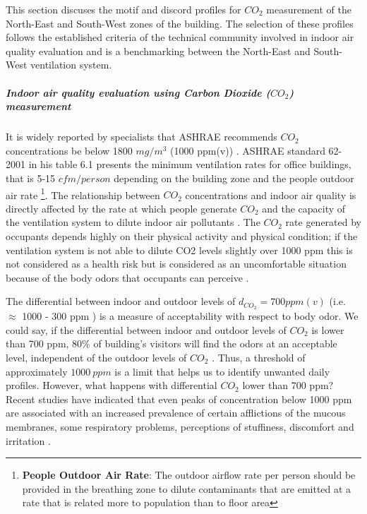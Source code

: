 This section discuses the motif and discord profiles for $CO_2$ measurement of the North-East and South-West zones of the building. The selection of these profiles follows the established criteria of the technical community involved in indoor air quality evaluation and is a benchmarking between the North-East and South-West ventilation system.


\subparagraph{\textit{Indoor air quality evaluation using Carbon Dioxide ($CO_2$) measurement}}


It is widely reported by specialists that ASHRAE recommends $CO_2$ concentrations be below 1800 $mg/m^{3}$ (1000
ppm(v)) \cite{persily1997evaluating,erdmann2002indoor, lee2000indoor}. ASHRAE standard 62-2001 \cite{standard2001standard} in his table 6.1 presents the minimum ventilation rates for office buildings, that is 5-15 $cfm/person$ depending on the building zone and the people outdoor air rate \footnote{\textbf{People Outdoor Air Rate}: The outdoor airflow rate per person should be provided in the breathing zone to dilute contaminants that are emitted at a rate that is related more to population than to floor area}. The relationship between $CO_2$ concentrations and indoor air quality is directly affected by the rate at which people generate $CO_2$ and the capacity of the ventilation
system to dilute indoor air pollutants \cite{persily1997evaluating}. The $CO_2$ rate generated by occupants depends highly on their physical activity and physical condition; if the ventilation system is not able to dilute CO2 levels slightly over 1000 ppm this is not considered as a health risk but is considered as an uncomfortable situation because of the body odors that occupants can perceive \cite{persily1997evaluating,prill2000measure}.


The differential between indoor and outdoor levels of $d_{CO_2} = 700 ppm(v)$ (i.e. $\approx$ 1000 - 300 ppm ) is a measure of acceptability with respect to body odor. We could say, if the differential between indoor and outdoor levels of $CO_2$ is lower than 700 ppm, 80\% of building’s visitors will find the odors at an acceptable level, independent of the outdoor levels of $CO_2$ \cite{persily1997evaluating}. Thus, a threshold of approximately $1000 \ ppm$ is a limit that helps us to identify unwanted daily profiles. However, what happens with differential $CO_2$ lower than 700 ppm? Recent studies have indicated that even peaks of concentration below 1000 ppm are associated with an increased prevalence of certain afflictions of the mucous membranes, some respiratory problems, perceptions of stuffiness, discomfort and irritation \cite{persily1997evaluating,erdmann2002indoor}. 


